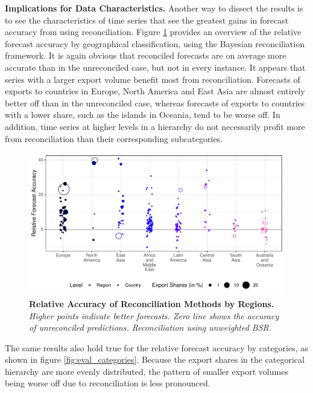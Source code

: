 \documentclass[a4paper,fleqn,11pt]{article}
\begin{document}
\noindent\textbf{Implications for Data Characteristics.} Another way to dissect the results is to see the characteristics of time series that see the greatest gains in forecast accuracy from using reconciliation. Figure \ref{fig:eval_regions} provides an overview of the relative forecast accuracy by geographical classification, using the Bayesian reconciliation framework. It is again obvious that reconciled forecasts are on average more accurate than in the unreconciled case, but not in every instance. It appears that series with a larger export volume benefit most from reconciliation. Forecasts of exports to countries in Europe, North America and East Asia are almost entirely better off than in the unreconciled case, whereas forecasts of exports to countries with a lower share, such as the islands in Oceania, tend to be worse off. In addition, time series at higher levels in a hierarchy do not necessarily profit more from reconciliation than their corresponding subcategories.
 \begin{figure}[H]
	\includegraphics[width=\textwidth]{fig/fig_eval_regions}
	\caption[Relative Accuracy of Reconciliation Methods by Regions]{\textbf{Relative Accuracy of Reconciliation Methods by Regions.} \textit{Higher points indicate better forecasts. Zero line shows the accuracy of unreconciled predictions. Reconciliation using unweighted BSR.}}\label{fig:eval_regions}
\end{figure}
The same results also hold true for the relative forecast accuracy by categories, as shown in figure \ref{fig:eval_categories}. Because the export shares in the categorical hierarchy are more evenly distributed, the pattern of smaller export volumes being worse off due to reconciliation is less pronounced.
\end{document}

